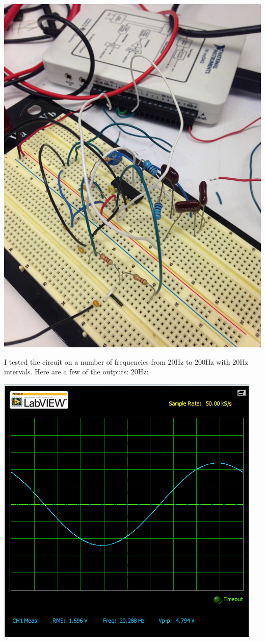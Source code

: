 \documentclass[12pt,letterpaper,boxed]{hmcpset}
\begin{document}
\begin{center}
\includegraphics[scale=.1]{realcirc}
\end{center}
I tested the circuit on a number of frequencies from 20Hz to 200Hz with 20Hz intervals. Here are a few of the outputs:
\newpage
20Hz:
\begin{center}
\includegraphics[scale=.8]{20Hz}
\end{center}
\end{document}
